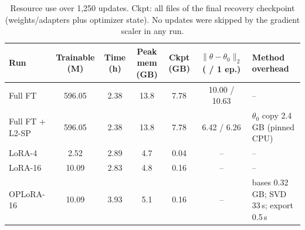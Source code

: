 \begin{table}[t]
\centering
\footnotesize
\setlength{\tabcolsep}{3.0pt}
\caption{Resource use over 1{,}250 updates. Ckpt: all files of the final recovery checkpoint (weights/adapters plus optimizer state). No updates were skipped by the gradient scaler in any run.}
\label{tab:resources}
\begin{tabular}{lcccccl}
\toprule
Run & Trainable (M) & Time (h) & Peak mem (GB) & Ckpt (GB) & $\|\theta-\theta_0\|_2$ (\textonehalf{} / 1 ep.) & Method overhead \\
\midrule
Full FT & 596.05 & 2.38 & 13.8 & 7.78 & 10.00 / 10.63 & -- \\
Full FT + L2-SP & 596.05 & 2.38 & 13.8 & 7.78 & 6.42 / 6.26 & $\theta_0$ copy 2.4\,GB (pinned CPU) \\
LoRA-4 & 2.52 & 2.89 & 4.7 & 0.04 & -- & -- \\
LoRA-16 & 10.09 & 2.83 & 4.8 & 0.16 & -- & -- \\
OPLoRA-16 & 10.09 & 3.93 & 5.1 & 0.16 & -- & bases 0.32\,GB; SVD 33\,s; export 0.5\,s \\
\bottomrule
\end{tabular}
\end{table}
